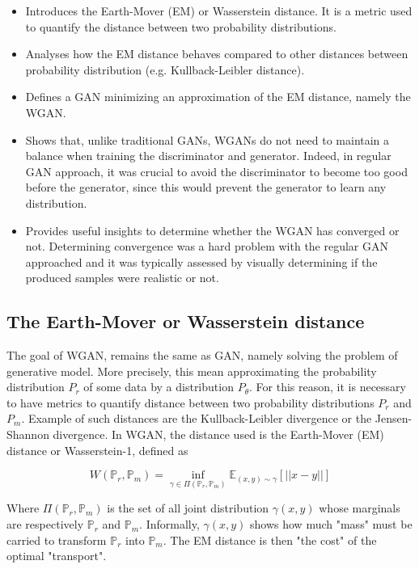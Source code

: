 \documentclass[11pt,a4paper,twoside]{report}
\begin{document}
\begin{itemize}
    \item Introduces the Earth-Mover (EM) or Wasserstein distance. It is a metric used to quantify the distance between two probability distributions.
    \item Analyses how the EM distance behaves compared to other distances between probability distribution (e.g. Kullback-Leibler distance).
    \item Defines a GAN minimizing an approximation of the EM distance, namely the WGAN.
    \item Shows that, unlike traditional GANs, WGANs do not need to maintain a balance when training the discriminator and generator. Indeed, in regular GAN approach, it was crucial to avoid the discriminator to become too good before the generator, since this would prevent the generator to learn any distribution.
    \item Provides useful insights to determine whether the WGAN has converged or not. Determining convergence was a hard problem with the regular GAN approached and it was typically assessed by visually determining if the produced samples were realistic or not.
\end{itemize}


\subsection{The Earth-Mover or Wasserstein distance}


The goal of WGAN, remains the same as GAN, namely solving the problem of generative model. More precisely, this mean approximating the probability distribution $P_r$ of some data by a distribution $P_{\theta}$. For this reason, it is necessary to have metrics to quantify distance between two probability distributions $P_r$ and $P_m$. Example of such distances are the Kullback-Leibler divergence or the Jensen-Shannon divergence. In WGAN, the distance used is the Earth-Mover (EM) distance or Wasserstein-1, defined as 

\begin{equation}
    W(\mathbb{P}_r, \mathbb{P}_m) = \inf_{\gamma \in \Pi(\mathbb{P}_r, \mathbb{P}_m)} \mathbb{E}_{(x,y) \sim \gamma} [||x-y||]
\end{equation}

Where $\Pi(\mathbb{P}_r, \mathbb{P}_m)$ is the set of all joint distribution $\gamma(x,y)$ whose marginals are respectively $\mathbb{P}_r$ and $\mathbb{P}_m$. Informally, $\gamma(x,y)$ shows how much "mass" must be carried to transform $\mathbb{P}_r$ into $\mathbb{P}_m$. The EM distance is then "the cost" of the optimal "transport".
\end{document}
